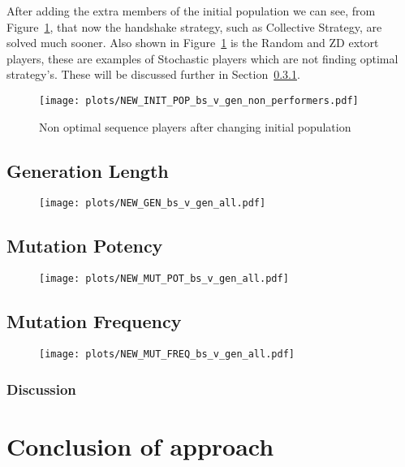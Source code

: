 After adding the extra members of the initial population we can see, from Figure~\ref{fig:NEW-INIT-POP-bs-v-gen-non-performers}, that now the handshake strategy, such as Collective Strategy, are solved much sooner.
Also shown in Figure~\ref{fig:NEW-INIT-POP-bs-v-gen-non-performers} is the Random and ZD extort players, these are examples of Stochastic players which are not finding optimal strategy's.
These will be discussed further in Section~\ref{subsubsec:discussion}.
\begin{figure}[h]
    \texttt{[image: plots/NEW\_INIT\_POP\_bs\_v\_gen\_non\_performers.pdf]}
    \caption{Non optimal sequence players after changing initial population}\label{fig:NEW-INIT-POP-bs-v-gen-non-performers}
\end{figure}

\subsection{Generation Length}\label{subsec:generationLength}
\begin{figure}[h]
    \texttt{[image: plots/NEW\_GEN\_bs\_v\_gen\_all.pdf]}
    \caption{}\label{fig:NEW-GEN-bs-v-gen-all}
\end{figure}

\subsection{Mutation Potency}\label{subsec:mutationPotency}
\begin{figure}[h]
    \texttt{[image: plots/NEW\_MUT\_POT\_bs\_v\_gen\_all.pdf]}
    \caption{}\label{fig:NEW-MUT-POT-bs-v-gen-all}
\end{figure}

\subsection{Mutation Frequency}\label{subsec:mutationFrequency}
\begin{figure}[h]
    \texttt{[image: plots/NEW\_MUT\_FREQ\_bs\_v\_gen\_all.pdf]}
    \caption{}\label{fig:NEW-MUT-FREQ-bs-gen-all}
\end{figure}
\subsubsection{Discussion}\label{subsubsec:discussion}

\section{Conclusion of approach}\label{sec:conclusionOfApproach}